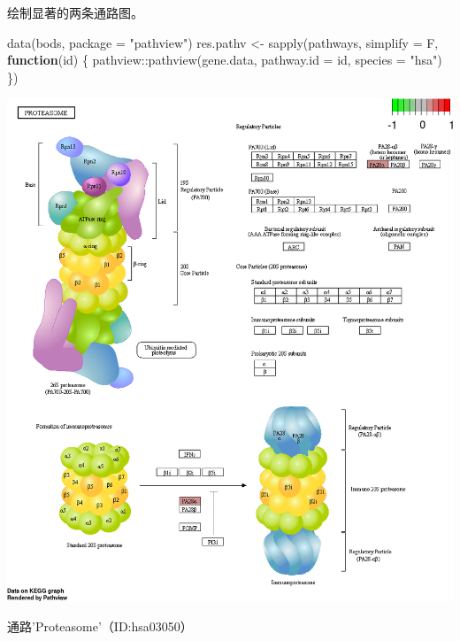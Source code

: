 \documentclass[
]{article}
\newenvironment{Shaded}{\begin{snugshade}}{\end{snugshade}}
\newcommand{\AttributeTok}[1]{\textcolor[rgb]{0.77,0.63,0.00}{#1}}
\newcommand{\ControlFlowTok}[1]{\textcolor[rgb]{0.13,0.29,0.53}{\textbf{#1}}}
\newcommand{\FunctionTok}[1]{\textcolor[rgb]{0.00,0.00,0.00}{#1}}
\newcommand{\NormalTok}[1]{#1}
\newcommand{\OtherTok}[1]{\textcolor[rgb]{0.56,0.35,0.01}{#1}}
\newcommand{\SpecialCharTok}[1]{\textcolor[rgb]{0.00,0.00,0.00}{#1}}
\newcommand{\StringTok}[1]{\textcolor[rgb]{0.31,0.60,0.02}{#1}}
\begin{document}
绘制显著的两条通路图。

\begin{Shaded}
\begin{Highlighting}[]
\FunctionTok{data}\NormalTok{(bods, }\AttributeTok{package =} \StringTok{"pathview"}\NormalTok{)}
\NormalTok{res.pathv }\OtherTok{\textless{}{-}} \FunctionTok{sapply}\NormalTok{(pathways, }\AttributeTok{simplify =}\NormalTok{ F,}
  \ControlFlowTok{function}\NormalTok{(id) \{}
\NormalTok{    pathview}\SpecialCharTok{::}\FunctionTok{pathview}\NormalTok{(gene.data, }\AttributeTok{pathway.id =}\NormalTok{ id, }\AttributeTok{species =} \StringTok{"hsa"}\NormalTok{)}
\NormalTok{  \})}
\end{Highlighting}
\end{Shaded}

\bgroup {}
\includegraphics[width=13.56in]{thesis_fig/hsa03050.pathview} \caption{通路'Proteasome'（ID:hsa03050）}\label{fig:keggPath}
\makeatletter \egroup
\end{document}
